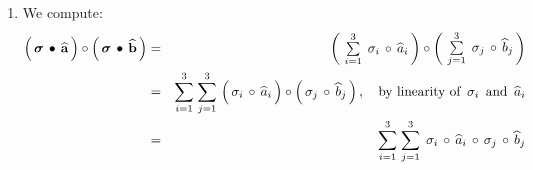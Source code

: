 \begin{enumerate}
\begin{equation*}
\begin{array}{c}
                \widehat{a}_{j}\!\left(\,\psi_{\uparrow}\,\right)
                \\
                \overset{{\color{white}.}}{
                    \widehat{a}_{j}\!\left(\,\psi_{\downarrow}\,\right)
                    }
                \end{array}
            \!\right),
    \quad\quad
    \left(\,\widehat{a}_{j} \,\circ\, \sigma_{i}\,\right)\left(\!
        \begin{array}{c}
            \psi_{\uparrow}
            \\
            \psi_{\downarrow}
            \end{array}
        \!\right)
    \;\; := \;\;
        \widehat{a}_{j}\!\left(\,\sigma_{i}\!\left(
            \begin{array}{c}
                \psi_{\uparrow}
                \\
                \overset{{\color{white}.}}{
                    \psi_{\downarrow}
                    }
                \end{array}
            \!\right)\,\right)
    \end{equation*}
\item
    We compute:
    \begin{eqnarray*}
    \left(\,\boldsymbol{\sigma} \,\overset{{\color{white}1}}{\bullet}\, \widehat{\mathbf{a}}\,\right)
    \circ
    \left(\,\boldsymbol{\sigma} \,\bullet\, \widehat{\mathbf{b}}\,\right)
    & = &
        \left(\!\begin{array}{cc}
            \overset{3}{\underset{i=1}{\sum}}\;\,
            \sigma_{i} \,\circ\, \widehat{a}_{i}
            \end{array}\!\!\right)
        \circ
        \left(\!\begin{array}{cc}
            \overset{3}{\underset{j=1}{\sum}}\;\,
            \sigma_{j} \,\circ\,\widehat{b}_{j}
            \end{array}\!\!\right)
    \\
    & = &
        \overset{3}{\underset{i=1}{\sum}}\;
        \overset{3}{\underset{j=1}{\sum}}\,
        \left(\,\sigma_{i} \,\overset{{\color{white}1}}{\circ}\, \widehat{a}_{i}\,\right)
        \circ
        \left(\,\sigma_{j} \,\circ\, \widehat{b}_{j}\,\right),
        \quad
        \textnormal{by linearity of \,$\sigma_{i}$\, and \,$\widehat{a}_{i}$}
    \\
    & = &
        \overset{3}{\underset{i=1}{\sum}}\;
        \overset{3}{\underset{j=1}{\sum}}\;\,
        \sigma_{i} \,\circ\, \widehat{a}_{i} \,\circ\, \sigma_{j} \,\circ\, \widehat{b}_{j}

\end{eqnarray*}
\end{enumerate}
